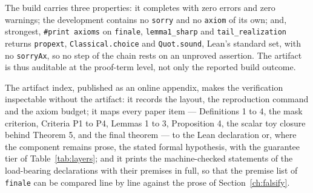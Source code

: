 The build carries three properties: it completes with zero errors and zero warnings; the development contains no \texttt{sorry} and no \texttt{axiom} of its own; and, strongest, \texttt{\#print axioms} on \texttt{finale}, \texttt{lemma1\_sharp} and \texttt{tail\_realization} returns \texttt{propext}, \texttt{Classical.choice} and \texttt{Quot.sound}, Lean's standard set, with no \texttt{sorryAx}, so no step of the chain rests on an unproved assertion. The artifact is thus auditable at the proof-term level, not only the reported build outcome.

The artifact index, published as an online appendix, makes the verification inspectable without the artifact: it records the layout, the reproduction command and the axiom budget; it maps every paper item --- Definitions 1 to 4, the mask criterion, Criteria P1 to P4, Lemmas 1 to 3, Proposition 4, the scalar toy closure behind Theorem 5, and the final theorem --- to the Lean declaration or, where the component remains prose, the stated formal hypothesis, with the guarantee tier of Table~\ref{tab:layers}; and it prints the machine-checked statements of the load-bearing declarations with their premises in full, so that the premise list of \texttt{finale} can be compared line by line against the prose of Section~\ref{ch:falsify}.
